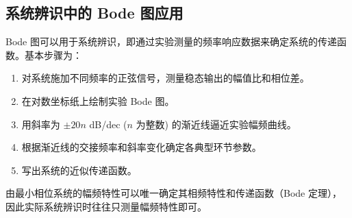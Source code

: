 \subsection{系统辨识中的 Bode 图应用}

Bode 图可以用于系统辨识，即通过实验测量的频率响应数据来确定系统的传递函数。基本步骤为：

\begin{enumerate}
    \item 对系统施加不同频率的正弦信号，测量稳态输出的幅值比和相位差。
    \item 在对数坐标纸上绘制实验 Bode 图。
    \item 用斜率为 $\pm20n$ dB/dec ($n$ 为整数) 的渐近线逼近实验幅频曲线。
    \item 根据渐近线的交接频率和斜率变化确定各典型环节参数。
    \item 写出系统的近似传递函数。
\end{enumerate}

\begin{remark}
由最小相位系统的幅频特性可以唯一确定其相频特性和传递函数（Bode 定理），因此实际系统辨识时往往只测量幅频特性即可。
\end{remark}

